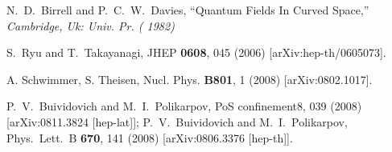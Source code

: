 \documentclass[11pt]{article}
\begin{document}
\begin{thebibliography}{99}
  N.~D.~Birrell and P.~C.~W.~Davies,
  ``Quantum Fields In Curved Space,''
{\it  Cambridge, Uk: Univ. Pr. ( 1982) }

  S.~Ryu and T.~Takayanagi,
  JHEP {\bf 0608}, 045 (2006)
  [arXiv:hep-th/0605073].

A. Schwimmer, S. Theisen, Nucl. Phys. {\bf B801}, 1 (2008) [arXiv:0802.1017]. 

  P.~V.~Buividovich and M.~I.~Polikarpov,
  PoS  confinement8, 039 (2008)
  [arXiv:0811.3824 [hep-lat]]; 
  P.~V.~Buividovich and M.~I.~Polikarpov,
  Phys.\ Lett.\  B {\bf 670}, 141 (2008)
  [arXiv:0806.3376 [hep-th]].




\end{thebibliography}    
\end{document}
